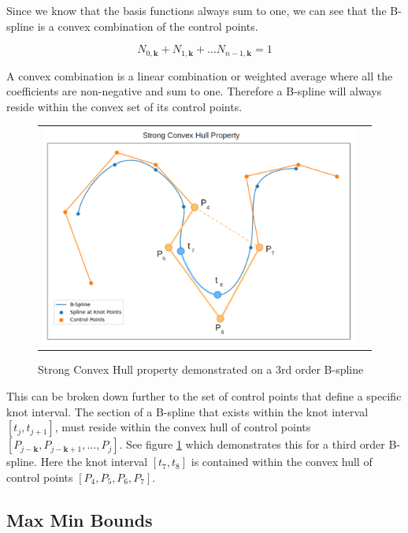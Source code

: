 \documentclass{article}
\begin{document}
    Since we know that the basis functions always sum to one, we can see that the B-spline is a convex combination of the control points. 
    
    \begin{equation}
        N_{0,\textbf{k}} + N_{1,\textbf{k}} + ...  N_{n-1,\textbf{k}} = 1
    \end{equation}
    
    
    A convex combination is a linear combination or weighted average where all the coefficients are non-negative and sum to one. Therefore a B-spline will always reside within the convex set of its control points.
    
\begin{figure}[H]
\begin{tabular}{ll}
\includegraphics[scale=.42]{ConvexHullProperty.png}
\end{tabular}
\caption{Strong Convex Hull property demonstrated on a 3rd order B-spline}
\label{Fig:ConvexHullProperty}
\end{figure}

    This can be broken down further to the set of control points that define a specific knot interval. The section of a B-spline that exists within the knot interval \([t_j, t_{j+1}]\), must reside within the convex hull of control points \([P_{j-\textbf{k}}, P_{j-\textbf{k}+1}, ... , P_{j}]\). See figure \ref{Fig:ConvexHullProperty} which demonstrates this for a third order B-spline. Here the knot interval \([t_7, t_{8}]\) is contained within the convex hull of control points \([P_4, P_5, P_6 , P_7]\).
    
    \subsection{Max Min Bounds}
    
\end{document}
